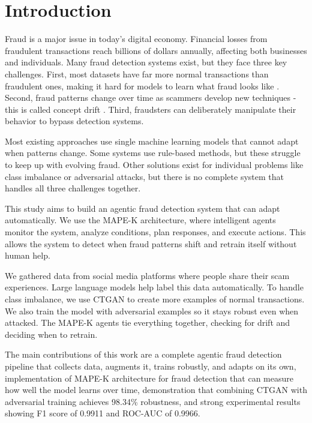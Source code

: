 \section{Introduction}\label{sec:intro}

Fraud is a major issue in today's digital economy. Financial losses from fraudulent transactions reach billions of dollars annually, affecting both businesses and individuals. Many fraud detection systems exist, but they face three key challenges. First, most datasets have far more normal transactions than fraudulent ones, making it hard for models to learn what fraud looks like \cite{dalpozzolo2015credit}. Second, fraud patterns change over time as scammers develop new techniques - this is called concept drift \cite{card2017}. Third, fraudsters can deliberately manipulate their behavior to bypass detection systems.

Most existing approaches use single machine learning models that cannot adapt when patterns change. Some systems use rule-based methods, but these struggle to keep up with evolving fraud. Other solutions exist for individual problems like class imbalance or adversarial attacks, but there is no complete system that handles all three challenges together.

This study aims to build an agentic fraud detection system that can adapt automatically. We use the MAPE-K architecture, where intelligent agents monitor the system, analyze conditions, plan responses, and execute actions. This allows the system to detect when fraud patterns shift and retrain itself without human help.

We gathered data from social media platforms where people share their scam experiences. Large language models help label this data automatically. To handle class imbalance, we use CTGAN to create more examples of normal transactions. We also train the model with adversarial examples so it stays robust even when attacked. The MAPE-K agents tie everything together, checking for drift and deciding when to retrain.

The main contributions of this work are a complete agentic fraud detection pipeline that collects data, augments it, trains robustly, and adapts on its own, implementation of MAPE-K architecture for fraud detection that can measure how well the model learns over time, demonstration that combining CTGAN with adversarial training achieves 98.34\% robustness, and strong experimental results showing F1 score of 0.9911 and ROC-AUC of 0.9966.